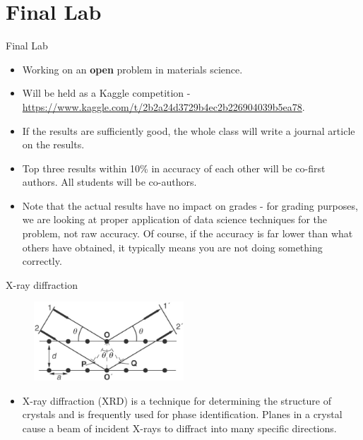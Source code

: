 \documentclass[aspectratio=169]{beamer}
\begin{document}
\section{Final Lab}

\begin{frame}{Final Lab}
    \begin{itemize}
        \item Working on an \textbf{open} problem in materials science.
        \item Will be held as a Kaggle competition - \url{https://www.kaggle.com/t/2b2a24d3729b4ec2b226904039b5ea78}.
        \item If the results are sufficiently good, the whole class will write a journal article on the results.
        \item Top three results within 10\% in accuracy of each other will be co-first authors. All students will be co-authors.
        \item Note that the actual results have no impact on grades - for grading purposes, we are looking at proper application of data science techniques for the problem, not raw accuracy. Of course, if the accuracy is far lower than what others have obtained, it typically means you are not doing something correctly.
    \end{itemize}
\end{frame}


 \begin{frame}{X-ray diffraction}
 \begin{figure}
     \centering
     \includegraphics[width=0.5\textwidth]{figures/xrd.png}
 \end{figure}
    \begin{itemize}
        \item X-ray diffraction (XRD) is a technique for determining the structure of crystals and is frequently used for phase identification. Planes in a crystal cause a beam of incident X-rays to diffract into many specific directions.
    \end{itemize}
\end{frame}
\end{document}
